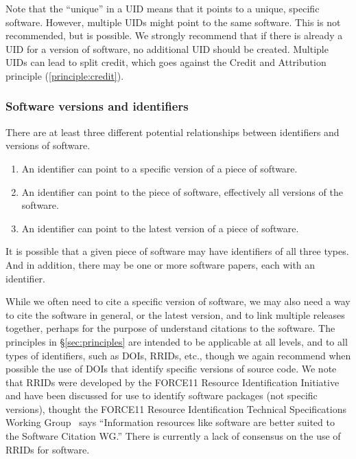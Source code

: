 \documentclass[11pt, oneside]{amsart}
\newcommand{\katznote}[1]{ {\textcolor{blue} { ***DSK: #1 }}} %
\newcommand{\LJHnote}[1]{ {\textcolor{fuschsia} { ***LJH: #1 }}} %
\begin{document}
Note that the ``unique'' in a UID means that it points to a unique, specific software. However, multiple UIDs might point to the same software.
This is not recommended, but is possible.
We strongly recommend that if there is already a UID for a version of software, no additional UID should be created.
Multiple UIDs can lead to split credit, which goes against the Credit and Attribution principle (\ref{principle:credit}).


\subsubsection*{Software versions and identifiers}

There are at least three different potential relationships between identifiers and versions of software.
\begin{enumerate}
\item An identifier can point to a specific version of a piece of software.
\item An identifier can point to the piece of software, effectively all versions of the software.
\item An identifier can point to the latest version of a piece of software.
\end{enumerate}
It is possible that a given piece of software may have identifiers of all three types.  And in addition,
there may be one or more software papers, each with an identifier.

While we often need to cite a specific version of software, we may also need a way to cite the
software in general, or the latest version, and to link multiple releases together, perhaps for
the purpose of understand citations to the software.  The principles in \S\ref{sec:principles} are
intended to be applicable at all levels, and to all types of identifiers, such as DOIs, RRIDs, etc.,
though we again recommend when possible the use of DOIs that identify specific versions of
source code.  We note that RRIDs were developed by the FORCE11 Resource Identification Initiative
and have been discussed for use to identify software packages (not specific versions),
thought the FORCE11 Resource Identification Technical Specifications Working
Group~\cite{f11rrridtswg} says ``Information resources like software are better suited to
the Software Citation WG.''
There is currently a lack of consensus on the use of RRIDs for software.
\end{document}

